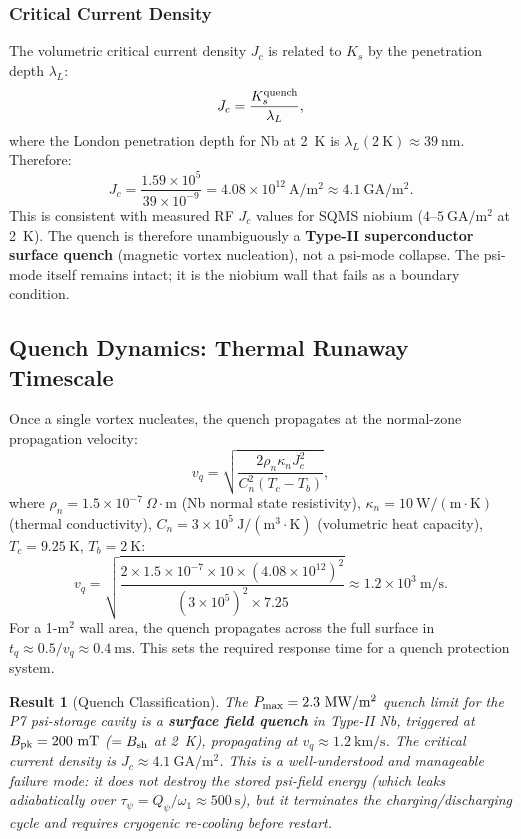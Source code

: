 \documentclass[aps,prd,twocolumn,superscriptaddress]{revtex4-2}
\newcommand{\Pmax}{P_{\rm max}}
\newtheorem{result}{Result}
\begin{document}
\subsubsection{Critical Current Density}

The volumetric critical current density $J_c$ is related to $K_s$ by
the penetration depth $\lambda_L$:
\begin{equation}
J_c = \frac{K_s^{\rm quench}}{\lambda_L},
\end{equation}
where the London penetration depth for Nb at 2~K is
$\lambda_L(2~\mathrm{K}) \approx 39~\mathrm{nm}$.  Therefore:
\begin{equation}
\boxed{J_c = \frac{1.59\times 10^5}{39\times 10^{-9}}
= 4.08\times 10^{12}~\mathrm{A/m^2} \approx 4.1~\mathrm{GA/m^2}.}
\end{equation}
This is consistent with measured RF $J_c$ values for SQMS niobium
($4$--$5~\mathrm{GA/m^2}$ at 2~K).  The quench is therefore unambiguously
a \textbf{Type-II superconductor surface quench} (magnetic vortex
nucleation), not a psi-mode collapse.  The psi-mode itself remains
intact; it is the niobium wall that fails as a boundary condition.

\subsection{Quench Dynamics: Thermal Runaway Timescale}

Once a single vortex nucleates, the quench propagates at the normal-zone
propagation velocity:
\begin{equation}
v_q = \sqrt{\frac{2\rho_n \kappa_n J_c^2}{C_n^2(T_c - T_b)}},
\end{equation}
where $\rho_n = 1.5\times 10^{-7}~\Omega\cdot\mathrm{m}$ (Nb normal
state resistivity), $\kappa_n = 10~\mathrm{W/(m\cdot K)}$ (thermal
conductivity), $C_n = 3\times 10^5~\mathrm{J/(m^3\cdot K)}$ (volumetric
heat capacity), $T_c = 9.25~\mathrm{K}$, $T_b = 2~\mathrm{K}$:
\begin{equation}
v_q = \sqrt{\frac{2\times 1.5\times 10^{-7}\times 10
\times (4.08\times 10^{12})^2}{(3\times 10^5)^2\times 7.25}}
\approx 1.2\times 10^3~\mathrm{m/s}.
\end{equation}
For a 1-m$^2$ wall area, the quench propagates across the full surface
in $t_q \approx 0.5 / v_q \approx 0.4~\mathrm{ms}$.  This sets the
required response time for a quench protection system.

\begin{result}[Quench Classification]
The $\Pmax = 2.3~\mathrm{MW/m^2}$ quench limit for the P7 psi-storage
cavity is a \textbf{surface field quench} in Type-II Nb, triggered at
$B_{\rm pk} = 200~\mathrm{mT}$ ($= B_{\rm sh}$ at 2~K), propagating
at $v_q \approx 1.2~\mathrm{km/s}$.  The critical current density is
$J_c \approx 4.1~\mathrm{GA/m^2}$.  This is a well-understood and
manageable failure mode: it does \emph{not} destroy the stored psi-field
energy (which leaks adiabatically over $\tau_\psi = Q_\psi/\omega_1
\approx 500~\mathrm{s}$), but it terminates the charging/discharging
cycle and requires cryogenic re-cooling before restart.
\end{result}
\end{document}
